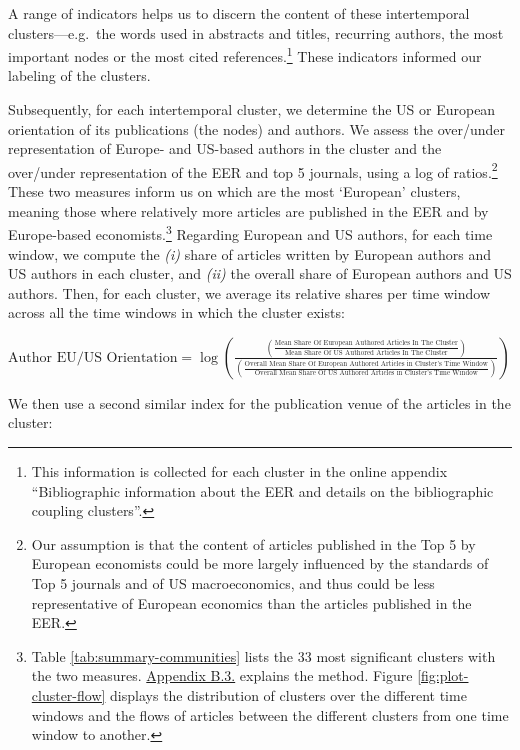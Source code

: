 \documentclass[
  12pt,
  onecolumn]{article}
\begin{document}
A range of indicators helps us to discern the content of these
intertemporal clusters---e.g.~the words used in abstracts and titles,
recurring authors, the most important nodes or the most cited
references.\footnote{This information is collected for each cluster in
  the online appendix ``Bibliographic information about the EER and
  details on the bibliographic coupling clusters''.} These indicators
informed our labeling of the clusters.

Subsequently, for each intertemporal cluster, we determine the US or
European orientation of its publications (the nodes) and authors. We
assess the over/under representation of Europe- and US-based authors in
the cluster and the over/under representation of the EER and top 5
journals, using a log of ratios.\footnote{Our assumption is that the
  content of articles published in the Top 5 by European economists
  could be more largely influenced by the standards of Top 5 journals
  and of US macroeconomics, and thus could be less representative of
  European economics than the articles published in the EER.} These two
measures inform us on which are the most `European' clusters, meaning
those where relatively more articles are published in the EER and by
Europe-based economists.\footnote{Table \ref{tab:summary-communities}
  lists the 33 most significant clusters with the two measures.
  \protect\hyperlink{network}{Appendix B.3.} explains the method. Figure
  \ref{fig:plot-cluster-flow} displays the distribution of clusters over
  the different time windows and the flows of articles between the
  different clusters from one time window to another.} Regarding
European and US authors, for each time window, we compute the \emph{(i)}
share of articles written by European authors and US authors in each
cluster, and \emph{(ii)} the overall share of European authors and US
authors. Then, for each cluster, we average its relative shares per time
window across all the time windows in which the cluster exists:

\bigskip

\({\scriptstyle \text{Author EU/US Orientation}=\log(\frac{(\frac{\text{Mean Share Of European Authored Articles In The Cluster}}{\text{Mean Share Of US Authored Articles In The Cluster}})} {(\frac{\text{Overall Mean Share Of European Authored Articles in Cluster's Time Window}}{\text{Overall Mean Share Of US Authored Articles in Cluster's Time Window}})})}\)
\bigskip

We then use a second similar index for the publication venue of the
articles in the cluster:
\end{document}
